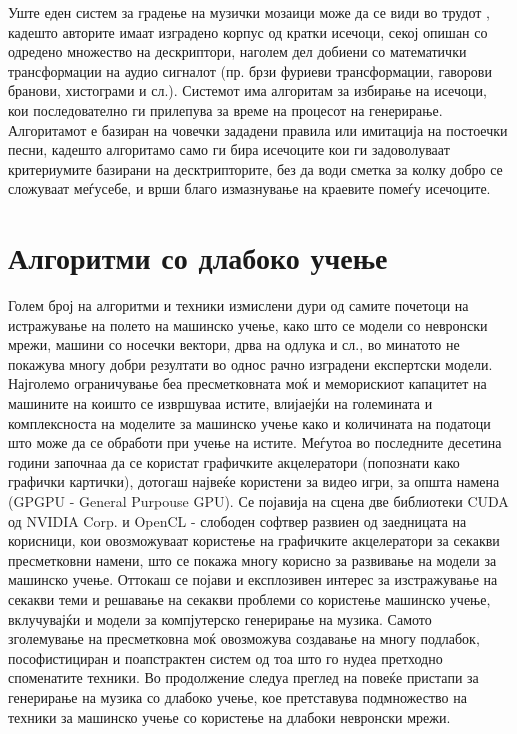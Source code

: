 Уште еден систем за градење на музички мозаици може да се види во трудот \cite{Schwarz2006}, кадешто авторите имаат изградено корпус од кратки исечоци, секој опишан со одредено множество на дескриптори, наголем дел добиени со математички трансформации на аудио сигналот (пр. брзи фуриеви трансформации, гаворови бранови, хистограми и сл.). Системот има алгоритам за избирање на исечоци, кои последователно ги прилепува за време на процесот на генерирање. Алгоритамот е базиран на човечки зададени правила или имитација на постоечки песни, кадешто алгоритамо само ги бира исечоците кои ги задоволуваат критериумите базирани на десктрипторите, без да води сметка за колку добро се сложуваат меѓусебе, и врши благо измазнување на краевите помеѓу исечоците.

\section{Алгоритми со длабоко учење} 

Голем број на алгоритми и техники измислени дури од самите почетоци на истражување на полето на машинско учење, како што се модели со невронски мрежи, машини со носечки вектори, дрва на одлука и сл., во минатото не покажува многу добри резултати во однос рачно изградени експертски модели. Најголемо ограничување беа пресметковната моќ и меморискиот капацитет на машините на коишто се извршуваа истите, влијаејќи на големината и комплексноста на моделите за машинско учење како и количината на податоци што може да се обработи при учење на истите. Меѓутоа во последните десетина години започнаа да се користат графичките акцелератори (попознати како графички картички), дотогаш највеќе користени за видео игри, за општа намена (GPGPU - General Purpouse GPU). Се појавија на сцена две библиотеки CUDA од NVIDIA Corp. и OpenCL - слободен софтвер развиен од заедницата на корисници, кои овозможуваат користење на графичките акцелератори за секакви пресметковни намени, што се покажа многу корисно за развивање на модели за машинско учење. Оттокаш се појави и експлозивен интерес за изстражување на секакви теми и решавање на секакви проблеми со користење машинско учење, вклучувајќи и модели за компјутерско генерирање на музика. Самото зголемување на пресметковна моќ овозможува создавање на многу подлабок, пософистициран и поапстрактен систем од тоа што го нудеа претходно споменатите техники. Во продолжение следуа преглед на повеќе пристапи за генерирање на музика со длабоко учење, кое претставува подмножество на техники за машинско учење со користење на длабоки невронски мрежи.

